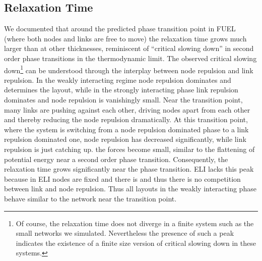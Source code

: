 \documentclass[nofootinbib,preprint,floatfix,titlepage,superscriptaddress]{revtex4} %
\begin{document}
\subsection{Relaxation Time \label{ap:relax}}
We documented that around the predicted phase transition point in FUEL (where both nodes and links are free to move) the relaxation time grows much larger than at other thicknesses, reminiscent of ``critical slowing down'' in second order phase transitions in the thermodynamic limit.  
The observed critical slowing down\footnote{Of course, the relaxation time does not diverge in a finite system such as the small networks we simulated. 
Nevertheless the presence of such a peak indicates the existence of a finite size version of critical slowing down in these systems.} 
can be understood through the interplay between node repulsion and link repulsion. 
In the weakly interacting regime node repulsion dominates and determines the layout, while in the strongly interacting phase link repulsion dominates and node repulsion is vanishingly small. 
Near the transition point, many links are pushing against each other, driving nodes apart from each other and thereby reducing the node repulsion dramatically. 
At this transition point, where the system is switching from a node repulsion dominated phase to a link repulsion dominated one, node repulsion has decreased significantly, while link repulsion is just catching up. the forces become small, similar to the flattening of potential energy near a second order phase transition.
Consequently, the relaxation time grows significantly near the phase transition. 
ELI lacks this peak %
because in ELI nodes are fixed and there is and thus there is no competition between link and node repulsion. 
Thus all layouts in the weakly interacting phase behave similar to the network near the transition point.  
\end{document}

